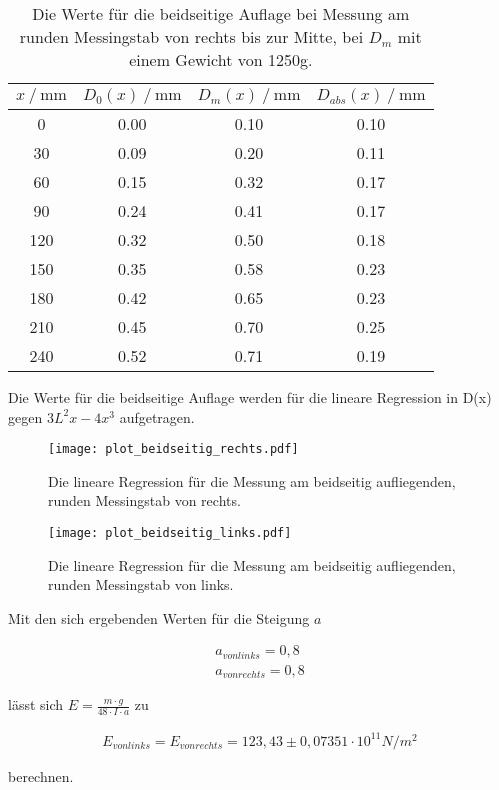 \begin{table}[H]
  \centering
  \caption{Die Werte für die beidseitige Auflage bei Messung am runden Messingstab von rechts bis zur Mitte, bei $D_m$ mit 
  einem Gewicht von 1250g.}
  \begin{tabular}{cccc}
    \toprule
    {$x \mathbin{/} \unit{\milli\metre}$} &
    {$D_0(x) \mathbin{/} \unit{\milli\metre}$} &
    {$D_m(x) \mathbin{/} \unit{\milli\metre}$} &
    {$D_{abs}(x) \mathbin{/} \unit{\milli\metre}$} \\
    \midrule
      0 & 0.00 & 0.10 & 0.10 \\
     30 & 0.09 & 0.20 & 0.11 \\  
     60 & 0.15 & 0.32 & 0.17 \\
     90 & 0.24 & 0.41 & 0.17 \\
    120 & 0.32 & 0.50 & 0.18 \\
    150 & 0.35 & 0.58 & 0.23 \\
    180 & 0.42 & 0.65 & 0.23 \\
    210 & 0.45 & 0.70 & 0.25 \\
    240 & 0.52 & 0.71 & 0.19 \\
    \bottomrule
  \end{tabular}
  \label{tab:Tabelle6}
\end{table}


Die Werte für die beidseitige Auflage werden für die lineare Regression in D(x) gegen $3L^2 x - 4x^3$ aufgetragen.



\begin{figure}
  \centering
  \texttt{[image: plot\_beidseitig\_rechts.pdf]}
  \caption{Die lineare Regression für die Messung am beidseitig aufliegenden, runden Messingstab von rechts.}
  \label{fig:plot_beidseitig_rechts}
\end{figure} 

\begin{figure}
  \centering
  \texttt{[image: plot\_beidseitig\_links.pdf]}
  \caption{Die lineare Regression für die Messung am beidseitig aufliegenden, runden Messingstab von links.}
  \label{fig:plot_beidseitig_links}
\end{figure}      

Mit den sich ergebenden Werten für die Steigung $a$ 

\begin{align*}
  a_{von links} = 0,8 \\
  a_{von rechts} = 0,8
\end{align*}

lässt sich $E = \frac{m \cdot g}{48 \cdot I \cdot a}$ zu

\begin{align*}
  E_{von links} = E_{von rechts} = 123,43 \pm 0,07351 \cdot 10^{11} N/m^2 
\end{align*}

berechnen.
